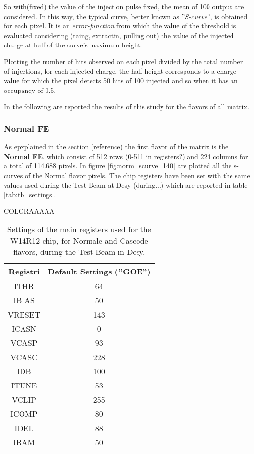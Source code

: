 So with(fixed) the value of the injection pulse fixed, the mean of 100 output are considered. In this way, the typical curve, better known as ''\textit{S-curve}'', is obtained for each pixel. It is an \textit{error-function} from which the value of the threshold is evaluated considering (taing, extractin, pulling out) the value of the injected charge at half of the curve's maximum height.

Plotting the number of hits observed on each pixel divided by the total number of injections, for each injected charge, the half height corresponds to a charge value for which the pixel detects 50 hits of 100 injected and so when it has an occupancy of 0.5.



\begin{comment}
\begin{figure}
\centering
\texttt{[image: ]}
\caption{An example of the S-Curve and the evluation of the threshold.}
\label{ex_scurve}
\end{figure}
\end{comment}

In the following are reported the results of this study for the flavors of all matrix.

\subsubsection{Normal FE}

As epxplained in the section (reference) the first flavor of the matrix is the \textbf{Normal FE}, which consist of 512 rows (0-511 in registers?) and 224 columns for a total of 114.688 pixels. In figure \vref{fig:norm_scurve_140} are plotted all the s-curves of the Normal flavor pixels. The chip registers have been set with the same values used during the Test Beam at Desy (during...) which are reported in table \vref{tab:tb_settings}.

COLORAAAAA

\begin{table}[h!]
\centering
\begin{tabular}{c|c}
Registri & Default Settings (''GOE'') \\
\hline
ITHR & 64 \\
\hline
IBIAS & 50 \\
\hline
VRESET & 143 \\
\hline
ICASN & 0 \\
\hline
VCASP & 93 \\
\hline
VCASC & 228 \\
\hline
IDB & 100 \\
\hline
ITUNE & 53 \\
\hline
VCLIP & 255 \\
\hline
ICOMP & 80 \\
\hline
IDEL & 88 \\
\hline
IRAM & 50 \\
\hline
\end{tabular}
\caption{Settings of the main registers used for the W14R12 chip, for Normale and Cascode flavors, during the Test Beam in Desy.}
\label{tab:tb_settings}
\end{table}

